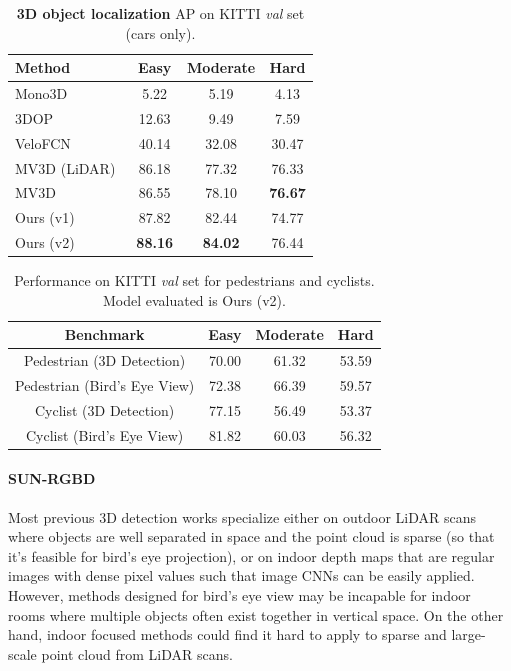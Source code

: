 \begin{table}[t!]
\small
\centering
\label{tab:kitti_valid}
\begin{tabular}{l||ccc}
\hline
Method & Easy    & Moderate   & Hard   \\ \hline
Mono3D~\cite{chen2016monocular} & 5.22 & 5.19 & 4.13 \\ %
3DOP~\cite{chen20153d}  & 12.63 & 9.49 & 7.59 \\ \hline
VeloFCN~\cite{li20163d} &  40.14 & 32.08 & 30.47 \\ %
MV3D (LiDAR)~\cite{cvpr17chen} & 86.18 & 77.32 & 76.33 \\ %
MV3D~\cite{cvpr17chen} & 86.55 & 78.10 & \textbf{76.67} \\ \hline
Ours (v1) & 87.82 & 82.44 & 74.77 \\
Ours (v2) & \textbf{88.16} & \textbf{84.02} & 76.44 \\ \hline
\end{tabular}
\caption{\textbf{3D object localization} AP on KITTI \emph{val} set (cars only).}
\label{tab:kitti_val_3d_localization}
\end{table}

\begin{table}[h!]
\small
\centering
\begin{tabular}{|c|c|c|c|}
    \hline
    Benchmark & Easy & Moderate & Hard \\ \hline
    Pedestrian (3D Detection) & 70.00 & 61.32 & 53.59 \\ \hline
    Pedestrian (Bird's Eye View) & 72.38 & 66.39 & 59.57 \\ \hline
    Cyclist (3D Detection) & 77.15 & 56.49 & 53.37 \\ \hline
    Cyclist (Bird's Eye View) & 81.82 & 60.03 & 56.32 \\ \hline
\end{tabular}
\caption{Performance on KITTI \emph{val} set for pedestrians and cyclists. Model evaluated is Ours (v2).}
\label{tab:val_ped_cyc}
\end{table}

\paragraph{SUN-RGBD} Most previous 3D detection works specialize either on outdoor LiDAR scans where objects are well separated in space and the point cloud is sparse (so that it's feasible for bird's eye projection), or on indoor depth maps that are regular images with dense pixel values such that image CNNs can be easily applied. However, methods designed for bird's eye view may be incapable for indoor rooms where multiple objects often exist together in vertical space. On the other hand, indoor focused methods could find it hard to apply to sparse and large-scale point cloud from LiDAR scans.

